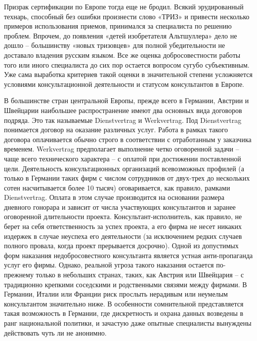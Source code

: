 \documentclass[11pt,a4paper]{article}
\begin{document}
Призрак сертификации по Европе тогда еще не бродил. Всякий эрудированный
технарь, способный без ошибки произнести слово «ТРИЗ» и привести несколько
примеров использования приемов, принимался за специалиста по решению проблем.
Впрочем, до появления «детей изобретателя Альтшуллера» дело не дошло --
большинству «новых тризовцев» для полной убедительности не доставало владения
русским языком. Все же оценка добросовестности работы того или иного
специалиста до сих пор остается вопросом сугубо субъективным. Уже сама
выработка критериев такой оценки в значительной степени усложняется условиями
консультационной деятельности и статусом консультантов в Европе.

В большинстве стран центральной Европы, прежде всего в Германии, Австрии и
Швейцарии наибольшее распространение имеют два основных вида договоров
подряда. Это так называемые Dienstvertrag и Werkvertrag. Под Dienstvertrag
понимается договор на оказание различных услуг. Работа в рамках такого
договора оплачивается обычно строго в соответствии с отработанным у заказчика
временем. Werkvertrag предполагает выполнение четко оговоренной задачи -- чаще
всего технического характера -- с оплатой при достижении поставленной цели.
Деятельность консультационных организаций всевозможных профилей (а только в
Германии таких фирм с числом сотрудников от двух-трех до нескольких сотен
насчитывается более 10 тысяч) оговаривается, как правило, рамками
Dienstvertrag.  Оплата в этом случае производится на основании размера
дневного гонорара и зависит от числа участвующих консультантов и заранее
оговоренной длительности проекта. Консультант-исполнитель, как правило, не
берет на себя ответственность за успех проекта, а его фирма не несет никаких
издержек в случае неуспеха его деятельности (за исключением редких случаев
полного провала, когда проект прерывается досрочно). Одной из допустимых форм
наказания недобросовестного консультанта является устная анти-пропаганда услуг
его фирмы. Однако, реальной угроза такого наказания остается по-прежнему
только в небольших странах, таких, как Австрия или Швейцария -- с традиционно
крепкими соседскими и родственными связями между фирмами. В Германии, Италии
или Франции риск прослыть нерадивым или неумелым консультантом значительно
ниже. В особенности сомнительной представляется такая возможность в Германии,
где дискретность и охрана данных возведены в ранг национальной политики, и
зачастую даже опытные специалисты вынуждены действовать чуть ли не анонимно.
\end{document}
